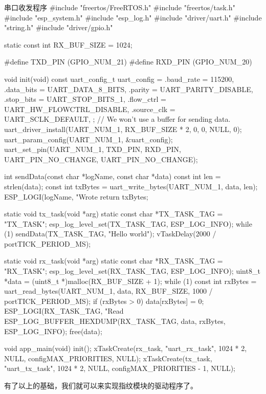 \documentclass[lang=cn,newtx,10pt,scheme=chinese]{elegantbook}
\begin{document}
\begin{mycode}{串口收发程序}
#include "freertos/FreeRTOS.h"
#include "freertos/task.h"
#include "esp_system.h"
#include "esp_log.h"
#include "driver/uart.h"
#include "string.h"
#include "driver/gpio.h"

static const int RX_BUF_SIZE = 1024;

#define TXD_PIN (GPIO_NUM_21)
#define RXD_PIN (GPIO_NUM_20)

void init(void)
{
    const uart_config_t uart_config = {
        .baud_rate = 115200,
        .data_bits = UART_DATA_8_BITS,
        .parity = UART_PARITY_DISABLE,
        .stop_bits = UART_STOP_BITS_1,
        .flow_ctrl = UART_HW_FLOWCTRL_DISABLE,
        .source_clk = UART_SCLK_DEFAULT,
    };
    // We won't use a buffer for sending data.
    uart_driver_install(UART_NUM_1, RX_BUF_SIZE * 2, 0, 0, NULL, 0);
    uart_param_config(UART_NUM_1, &uart_config);
    uart_set_pin(UART_NUM_1, TXD_PIN, RXD_PIN, UART_PIN_NO_CHANGE, UART_PIN_NO_CHANGE);
}

int sendData(const char *logName, const char *data)
{
    const int len = strlen(data);
    const int txBytes = uart_write_bytes(UART_NUM_1, data, len);
    ESP_LOGI(logName, "Wrote %
    return txBytes;
}

static void tx_task(void *arg)
{
    static const char *TX_TASK_TAG = "TX_TASK";
    esp_log_level_set(TX_TASK_TAG, ESP_LOG_INFO);
    while (1)
    {
        sendData(TX_TASK_TAG, "Hello world");
        vTaskDelay(2000 / portTICK_PERIOD_MS);
    }
}

static void rx_task(void *arg)
{
    static const char *RX_TASK_TAG = "RX_TASK";
    esp_log_level_set(RX_TASK_TAG, ESP_LOG_INFO);
    uint8_t *data = (uint8_t *)malloc(RX_BUF_SIZE + 1);
    while (1)
    {
        const int rxBytes = uart_read_bytes(UART_NUM_1, data, RX_BUF_SIZE, 1000 / portTICK_PERIOD_MS);
        if (rxBytes > 0)
        {
            data[rxBytes] = 0;
            ESP_LOGI(RX_TASK_TAG, "Read %
            ESP_LOG_BUFFER_HEXDUMP(RX_TASK_TAG, data, rxBytes, ESP_LOG_INFO);
        }
    }
    free(data);
}

void app_main(void)
{
    init();
    xTaskCreate(rx_task, "uart_rx_task", 1024 * 2, NULL, configMAX_PRIORITIES, NULL);
    xTaskCreate(tx_task, "uart_tx_task", 1024 * 2, NULL, configMAX_PRIORITIES - 1, NULL);
}
\end{mycode}

有了以上的基础，我们就可以来实现指纹模块的驱动程序了。
\end{document}
